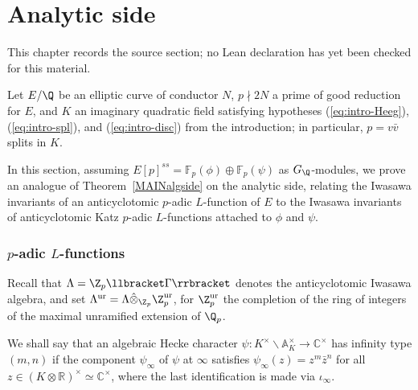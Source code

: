 \chapter{Analytic side}
\label{anticyclotomic-iwasawa-rational-elliptic-eisenstein-chapter-03}

\begin{remark}
\label{anticyclotomic-iwasawa-rational-elliptic-eisenstein-chapter-03-source}
This chapter records the source section; no Lean declaration has yet been checked for this material.
\notready
\end{remark}

\label{IMCII}

Let $E/\Q$ be an elliptic curve of conductor $N$, $p\nmid 2N$ a prime of good reduction for $E$, and $K$ an imaginary quadratic field satisfying hypotheses (\ref{eq:intro-Heeg}), (\ref{eq:intro-spl}), and (\ref{eq:intro-disc}) from the introduction; in particular, $p=v\bar{v}$ splits in $K$.

In this section, assuming $E[p]^{ss}=\mathbb{F}_p(\phi)\oplus\mathbb{F}_p(\psi)$ as $G_\Q$-modules, we prove an analogue of  Theorem~\ref{MAINalgside} on the analytic side, relating the Iwasawa invariants of an anticyclotomic $p$-adic $L$-function of $E$ to the Iwasawa invariants of anticyclotomic Katz $p$-adic $L$-functions attached to $\phi$ and $\psi$.


\subsection{\texorpdfstring{$p$}{p}-adic \texorpdfstring{$L$}{L}-functions}\label{subsec:Lp}

Recall that $\Lambda=\Z_p\llbracket\Gamma\rrbracket$ denotes the anticyclotomic Iwasawa algebra, and set $\Lambda^{\rm ur}=\Lambda\hat{\otimes}_{\Z_p}\Z_p^{\rm ur}$,
for $\Z_p^{\rm ur}$ the completion of the ring of integers of the maximal unramified extension of $\Q_p$.

We shall say that an algebraic Hecke character $\psi:K^\times\backslash\mathbb{A}_K^\times\rightarrow\mathbb{C}^\times$ has infinity type $(m,n)$ if
the component $\psi_\infty$ of $\psi$ at $\infty$ satisfies
$\psi_\infty(z)=z^{m}\bar{z}^{n}$ for all $z\in (K\otimes\mathbb{R})^\times\simeq\mathbb{C}^\times$,
where the last identification is made via $\iota_\infty$.


